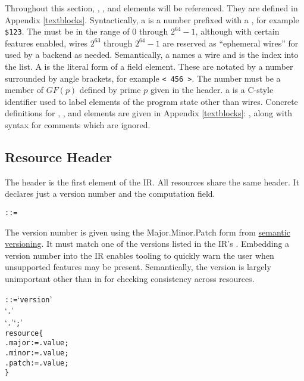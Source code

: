 Throughout this section, , , and  elements will be referenced.
They are defined in Appendix \ref{textblocks}.
Syntactically, a  is a number prefixed with a \synFrag{\$}, for example \texttt{\$123}.
The  must be in the range of $0$ through $2^{64} - 1$, although with certain features enabled, wires $2^{63}$ through $2^{64} - 1$ are reserved as ``ephemeral wires'' for used by a backend as needed.
Semantically, a  names a wire and is the index into the  list.
A  is the literal form of a field element.
These are notated by a number surrounded by angle brackets, for example \texttt{< 456 >}.
The number must be a member of $GF(p)$ defined by prime $p$ given in the header.
a  is a C-style identifier used to label elements of the program state other than wires.
Concrete definitions for , , and  elements are given in Appendix \ref{textblocks}: , along with syntax for comments which are ignored.\\

\subsection{Resource Header}\label{header_text}
The header is the first element of the IR.
All resources share the same header.
It declares just a version number and the computation field.\\

\begin{alltt}\ttSyn
   ::=
\end{alltt}

The version number is given using the Major.Minor.Patch form from \href{https://semver.org/}{semantic versioning}.
It must match one of the versions listed in the IR's .
Embedding a version number into the IR enables tooling to quickly warn the user when unsupported features may be present.
Semantically, the version is largely unimportant other than in for checking consistency across resources. \\

\begin{alltt}\ttSyn
   ::= `version' 
                   `.' 
                   `.'  `;'\ttSem
  resource \{
    .major := .value;
    .minor := .value;
    .patch := .value;
  \}
\end{alltt}

